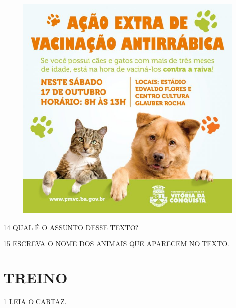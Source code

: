 \begin{figure}[H]
\centering
\includegraphics[width=\textwidth]{media/image165.jpeg}
\end{figure}

\num{14} QUAL É O ASSUNTO DESSE TEXTO?


\num{15} ESCREVA O NOME DOS ANIMAIS QUE APARECEM NO TEXTO.


\section*{TREINO}


\num{1} LEIA O CARTAZ.

